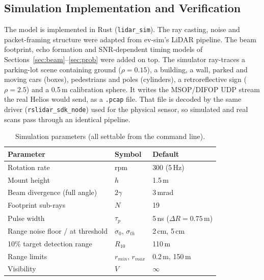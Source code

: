 \documentclass[11pt]{article}
\begin{document}
\subsection{Simulation Implementation and Verification}
The model is implemented in Rust (\texttt{lidar\_sim}). The ray casting, noise and packet-framing structure were adapted from ev-sim's LiDAR pipeline.
The beam footprint, echo formation and SNR-dependent timing models of Sections~\ref{sec:beam}--\ref{sec:prob} were added on top.
The simulator ray-traces a parking-lot scene containing ground ($\rho = 0.15$), a building, a wall, parked and moving cars (boxes),
pedestrians and poles (cylinders), a retroreflective sign ($\rho = 2.5$) and a 0.5\,m calibration sphere. It writes the MSOP/DIFOP UDP stream the real
Helios would send, as a \texttt{.pcap} file. That file is decoded by the same driver (\texttt{rslidar\_sdk\_node}) used for the physical sensor, so simulated
and real scans pass through an identical pipeline.

\begin{table}[h]
\centering
\begin{tabular}{lll}
\toprule
Parameter & Symbol & Default \\
\midrule
Rotation rate & rpm & 300 (5\,Hz) \\
Mount height & $h$ & 1.5\,m \\
Beam divergence (full angle) & $2\gamma$ & 3\,mrad \\
Footprint sub-rays & $N$ & 19 \\
Pulse width & $\tau_p$ & 5\,ns ($\Delta R = 0.75$\,m) \\
Range noise floor / at threshold & $\sigma_0$, $\sigma_{th}$ & 2\,cm, 5\,cm \\
10\% target detection range & $R_{10}$ & 110\,m \\
Range limits & $r_{min}$, $r_{max}$ & 0.2\,m, 150\,m \\
Visibility & $V$ & $\infty$ \\
\bottomrule
\end{tabular}
\caption{Simulation parameters (all settable from the command line).}
\end{table}
\end{document}
